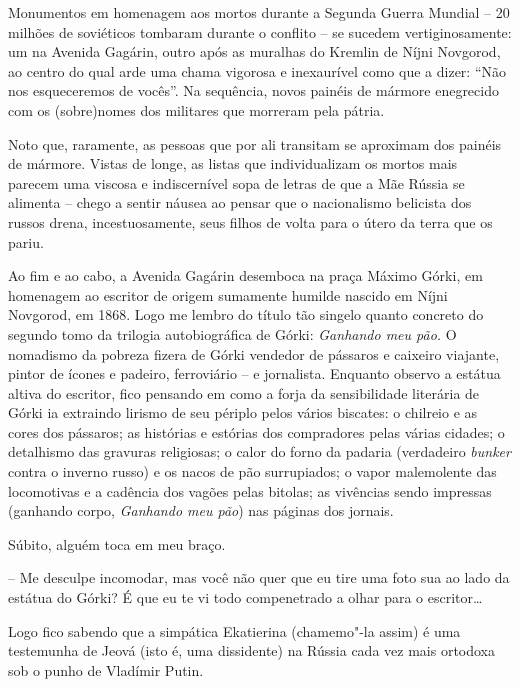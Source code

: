 Monumentos em homenagem aos mortos durante a Segunda Guerra Mundial --
20 milhões de soviéticos tombaram durante o conflito -- se sucedem
vertiginosamente: um na Avenida Gagárin, outro após as muralhas do
Kremlin de Níjni Novgorod, ao centro do qual arde uma chama vigorosa e
inexaurível como que a dizer: ``Não nos esqueceremos de vocês''. Na
sequência, novos painéis de mármore enegrecido com os (sobre)nomes dos
militares que morreram pela pátria.

Noto que, raramente, as pessoas que por ali transitam se aproximam dos
painéis de mármore. Vistas de longe, as listas que individualizam os
mortos mais parecem uma viscosa e indiscernível sopa de letras de que a
Mãe Rússia se alimenta -- chego a sentir náusea ao pensar que o
nacionalismo belicista dos russos drena, incestuosamente, seus filhos de
volta para o útero da terra que os pariu.

Ao fim e ao cabo, a Avenida Gagárin desemboca na praça Máximo Górki, em
homenagem ao escritor de origem sumamente humilde nascido em Níjni
Novgorod, em 1868. Logo me lembro do título tão singelo quanto concreto
do segundo tomo da trilogia autobiográfica de Górki: \emph{Ganhando meu
pão.} O nomadismo da pobreza fizera de Górki vendedor de pássaros e
caixeiro viajante, pintor de ícones e padeiro, ferroviário -- e
jornalista. Enquanto observo a estátua altiva do escritor, fico pensando
em como a forja da sensibilidade literária de Górki ia extraindo lirismo
de seu périplo pelos vários biscates: o chilreio e as cores dos
pássaros; as histórias e estórias dos compradores pelas várias cidades;
o detalhismo das gravuras religiosas; o calor do forno da padaria
(verdadeiro \emph{bunker} contra o inverno russo) e os nacos de pão
surrupiados; o vapor malemolente das locomotivas e a cadência dos vagões
pelas bitolas; as vivências sendo impressas (ganhando corpo,
\emph{Ganhando meu pão}) nas páginas dos jornais.

Súbito, alguém toca em meu braço.

-- Me desculpe incomodar, mas você não quer que eu tire uma foto sua ao
lado da estátua do Górki? É que eu te vi todo compenetrado a olhar para
o escritor\ldots{}

Logo fico sabendo que a simpática Ekatierina (chamemo"-la assim) é uma
testemunha de Jeová (isto é, uma dissidente) na Rússia cada vez mais
ortodoxa sob o punho de Vladímir Putin.

